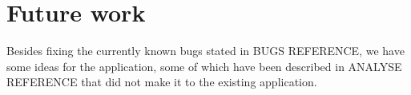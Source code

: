 \chapter{Future work}

Besides fixing the currently known bugs stated in BUGS REFERENCE, we have some ideas for the application, some of which have been described in ANALYSE REFERENCE that did not make it to the existing application.

